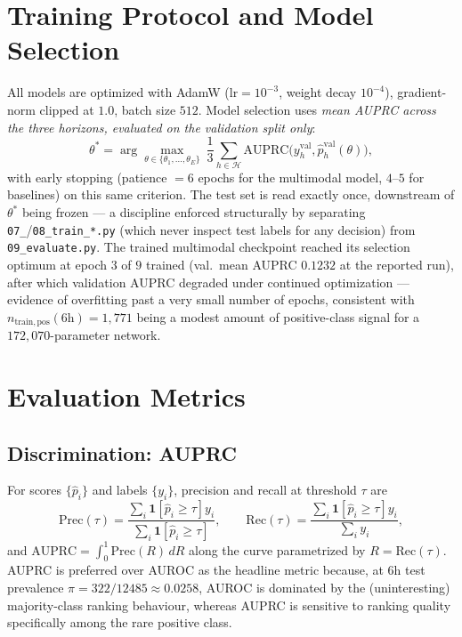 \documentclass[11pt]{article}
\newcommand{\1}[1]{\mathbf{1}\!\left[#1\right]}
\begin{document}
\section{Training Protocol and Model Selection}

All models are optimized with AdamW ($\mathrm{lr}=10^{-3}$, weight decay $10^{-4}$), gradient-norm clipped at $1.0$, batch size $512$. Model selection uses \emph{mean AUPRC across the three horizons, evaluated on the validation split only}:
\begin{equation}
\theta^\ast = \arg\max_{\theta \in \{\theta_1,\dots,\theta_E\}} \ \frac13\sum_{h\in\mathcal H} \mathrm{AUPRC}\big(y_h^{\mathrm{val}}, \hat p_h^{\mathrm{val}}(\theta)\big),
\end{equation}
with early stopping (patience $=6$ epochs for the multimodal model, $4$--$5$ for baselines) on this same criterion. The test set is read exactly once, downstream of $\theta^\ast$ being frozen — a discipline enforced structurally by separating \texttt{07\_}/\texttt{08\_train\_*.py} (which never inspect test labels for any decision) from \texttt{09\_evaluate.py}. The trained multimodal checkpoint reached its selection optimum at epoch $3$ of $9$ trained (val.\ mean AUPRC $0.1232$ at the reported run), after which validation AUPRC degraded under continued optimization — evidence of overfitting past a very small number of epochs, consistent with $n_{\mathrm{train,pos}}(6\mathrm h)=1{,}771$ being a modest amount of positive-class signal for a $172{,}070$-parameter network.

\section{Evaluation Metrics}

\subsection{Discrimination: AUPRC}

For scores $\{\hat p_i\}$ and labels $\{y_i\}$, precision and recall at threshold $\tau$ are
\begin{equation}
\mathrm{Prec}(\tau) = \frac{\sum_i \1{\hat p_i \ge \tau}y_i}{\sum_i \1{\hat p_i\ge\tau}}, \qquad
\mathrm{Rec}(\tau) = \frac{\sum_i \1{\hat p_i\ge\tau}y_i}{\sum_i y_i},
\end{equation}
and $\mathrm{AUPRC} = \int_0^1 \mathrm{Prec}(R)\,dR$ along the curve parametrized by $R=\mathrm{Rec}(\tau)$. AUPRC is preferred over AUROC as the headline metric because, at $6$h test prevalence $\pi=322/12485\approx0.0258$, AUROC is dominated by the (uninteresting) majority-class ranking behaviour, whereas AUPRC is sensitive to ranking quality specifically among the rare positive class.
\end{document}
